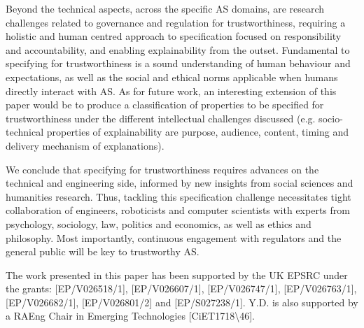 \documentclass[sigconf,nonacm]{acmart}%
\begin{document}
	Beyond the technical aspects, across the specific AS domains, are research challenges related to governance and regulation for trustworthiness, requiring a holistic and human centred approach to specification focused on responsibility and accountability, and enabling explainability from the outset. 
	Fundamental to specifying for trustworthiness is a sound understanding of human behaviour and expectations, as well as the social and ethical norms applicable when humans directly interact with AS. 
	As for future work, an interesting extension of this paper would be to produce a classification of properties to be specified for trustworthiness under the different intellectual challenges discussed (e.g. socio-technical properties of explainability are purpose, audience, content, timing and delivery mechanism of explanations). 
	
	We conclude that specifying for trustworthiness requires advances on the technical and engineering side, informed by new insights from social sciences and humanities research. Thus, tackling this specification challenge necessitates tight collaboration of engineers, roboticists and computer scientists with experts from psychology, sociology, law, politics and economics, as well as ethics and philosophy. Most importantly, continuous engagement with regulators and the general public will be key to trustworthy AS.
	
	\begin{acks}
		The work presented in this paper has been supported by the UK EPSRC under the grants: [EP/V026518/1], [EP/V026607/1], [EP/V026747/1], [EP/V026763/1], [EP/V026682/1], [EP/V026801/2] and [EP/S027238/1]. Y.D. is also supported by a RAEng Chair in Emerging Technologies [CiET1718\textbackslash46].
	\end{acks}
	
	
	
\end{document}
